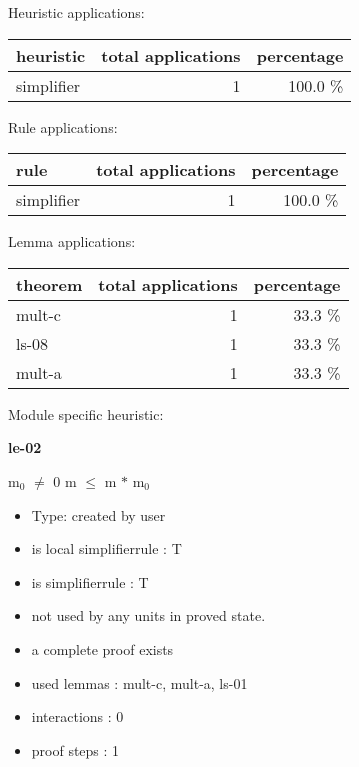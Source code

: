 \documentclass[a4paper]{article}
\begin{document}
\medskip


Heuristic applications:

\begin{supertabular}{l|r|r}
heuristic	& total applications & percentage \\ \hline
simplifier & 1 & 100.0 \% \\

\end{supertabular}

Rule applications:

\begin{supertabular}{l|r|r}
rule	        & total applications & percentage \\ \hline
simplifier & 1 & 100.0 \% \\

\end{supertabular}

Lemma applications:

\begin{supertabular}{l|r|r}
theorem	        & total applications & percentage \\ \hline
mult-c & 1 & 33.3 \% \\
ls-08 & 1 & 33.3 \% \\
mult-a & 1 & 33.3 \% \\

\end{supertabular}

Module specific heuristic:

\pagebreak

{\LARGE\bf le-02}\label{lemma-le-02}

\medskip

 \Fol $\mbox{m}_{0}$ $\neq$ 0 \Imp m $\le$ m $*$ $\mbox{m}_{0}$

\begin{itemize}

\item Type: created by user

\item is local simplifierrule : T
\item is simplifierrule : T
\item not used by any units in proved state.
\item       a complete proof exists
\item       used lemmas  : mult-c, mult-a, ls-01
\item       interactions : 0
\item       proof steps  : 1
\end{itemize}
\end{document}
